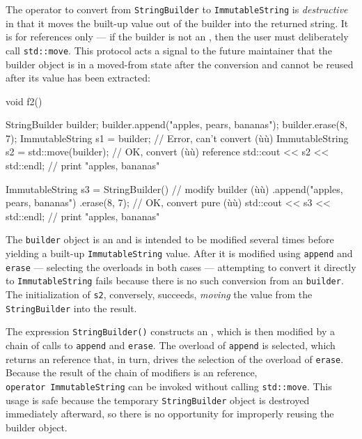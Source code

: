The operator to convert from \lstinline!StringBuilder! to
\lstinline!ImmutableString! is \emph{destructive} in that it moves the
built-up value out of the builder into the returned string. It is
 for  references only --- if the
builder is not an , then the user must deliberately call
\lstinline!std::move!. This protocol acts a signal to the future maintainer
that the builder object is in a moved-from state after the conversion
and cannot be reused after its value has been extracted:

\begin{emcppslisting}[emcppsbatch=e6]
void f2()
{
    StringBuilder builder;
    builder.append("apples, pears, bananas");
    builder.erase(8, 7);
    ImmutableString s1 = builder;             // Error, can't convert (ù{}ù)
    ImmutableString s2 = std::move(builder);  // OK, convert (ù{}ù) reference
    std::cout << s2 << std::endl;             // print "apples, bananas"

    ImmutableString s3 = StringBuilder()      // modify builder (ù{}ù)
        .append("apples, pears, bananas")
        .erase(8, 7);                         // OK, convert pure (ù{}ù)
    std::cout << s3 << std::endl;             // print "apples, bananas"
}
\end{emcppslisting}
    

\noindent The \lstinline!builder! object is an  and is intended to be
modified several times before yielding a built-up
\lstinline!ImmutableString! value. After it is modified using
\lstinline!append! and \lstinline!erase! --- selecting the 
overloads in both cases --- attempting to convert it directly to
\lstinline!ImmutableString! fails because there is no such conversion from
an  \lstinline!builder!. The initialization of \lstinline!s2!,
conversely, succeeds, \emph{moving} the value from the
\lstinline!StringBuilder! into the result.

The expression \lstinline!StringBuilder()! constructs an ,
which is then modified by a chain of calls to \lstinline!append! and
\lstinline!erase!. The  overload of \lstinline!append! is
selected, which returns an  reference that, in turn, drives
the selection of the  overload of \lstinline!erase!. Because
the result of the chain of modifiers is an  reference,
\lstinline!operator!~\lstinline!ImmutableString! can be invoked without
calling \lstinline!std::move!. This usage is safe because the temporary
\lstinline!StringBuilder! object is destroyed immediately afterward, so
there is no opportunity for improperly reusing the builder object.

